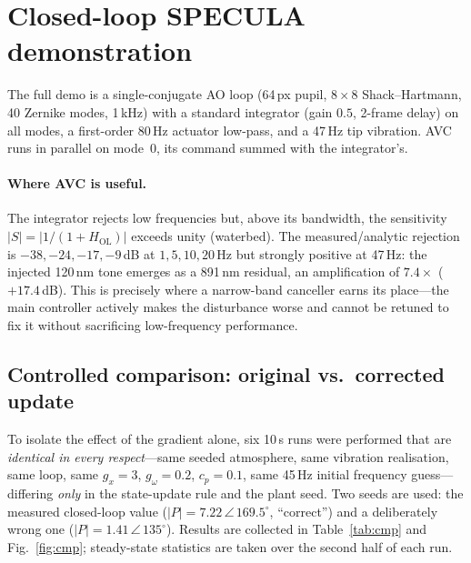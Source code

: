 \documentclass[11pt]{article}
\newcommand{\SI}[2]{#1\,#2}
\begin{document}
\section{Closed-loop SPECULA demonstration}
\label{sec:demo}

The full demo is a single-conjugate AO loop (\SI{64}{px} pupil, $8\times8$
Shack--Hartmann, 40 Zernike modes, \SI{1}{kHz}) with a standard integrator
(gain $0.5$, 2-frame delay) on all modes, a first-order \SI{80}{Hz}
actuator low-pass, and a \SI{47}{Hz} tip vibration. AVC runs in parallel on
mode~0, its command summed with the integrator's.

\paragraph{Where AVC is useful.}
The integrator rejects low frequencies but, above its bandwidth, the
sensitivity $|S|=|1/(1+H_{\text{OL}})|$ exceeds unity (waterbed). The
measured/analytic rejection is $-38,-24,-17,-9$\,dB at $1,5,10,20$\,Hz but
strongly positive at \SI{47}{Hz}: the injected \SI{120}{nm} tone emerges as
a \SI{891}{nm} residual, an amplification of $7.4\times$ ($+17.4$\,dB).
This is precisely where a narrow-band canceller earns its place---the main
controller actively makes the disturbance worse and cannot be retuned to
fix it without sacrificing low-frequency performance.

\subsection{Controlled comparison: original vs.\ corrected update}
\label{sec:cmp}

To isolate the effect of the gradient alone, six \SI{10}{s} runs were
performed that are \emph{identical in every respect}---same seeded
atmosphere, same vibration realisation, same loop, same
$g_x=3$, $g_\omega=0.2$, $c_{\!p}=0.1$, same \SI{45}{Hz} initial frequency
guess---differing \emph{only} in the state-update rule and the plant seed.
Two seeds are used: the measured closed-loop value
($|P|=7.22\,\angle\,169.5^\circ$, ``correct'') and a deliberately wrong one
($|P|=1.41\,\angle\,135^\circ$). Results are collected in
Table~\ref{tab:cmp} and Fig.~\ref{fig:cmp}; steady-state statistics are
taken over the second half of each run.
\end{document}
